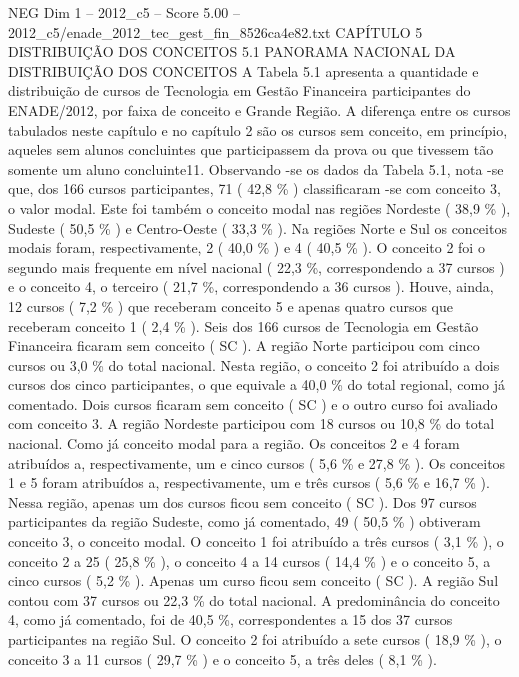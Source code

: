 \begin{textsample}{NEG Dim 1 – 2012\_c5 – Score 5.00 – 2012\_c5/enade\_2012\_tec\_gest\_fin\_8526ca4e82.txt}  \label{ex:f1_neg_326}
CAPÍTULO 5 DISTRIBUIÇÃO DOS CONCEITOS 5.1 PANORAMA NACIONAL DA DISTRIBUIÇÃO DOS CONCEITOS A Tabela 5.1 apresenta a quantidade e distribuição de cursos de Tecnologia em Gestão Financeira participantes do ENADE/2012, por faixa de conceito e Grande Região.
A diferença entre os cursos tabulados neste capítulo e no capítulo 2 são os cursos sem conceito, em princípio, aqueles sem alunos concluintes que participassem da prova ou que tivessem tão somente um aluno concluinte11.
Observando -se os dados da Tabela 5.1, nota -se que, dos 166 cursos participantes, 71 ( 42,8 \% ) classificaram -se com conceito 3, o valor modal.
Este foi também o conceito modal nas regiões Nordeste ( 38,9 \% ), Sudeste ( 50,5 \% ) e Centro-Oeste ( 33,3 \% ).
Na regiões Norte e Sul os conceitos modais foram, respectivamente, 2 ( 40,0 \% ) e 4 ( 40,5 \% ).
O conceito 2 foi o segundo mais frequente em nível nacional ( 22,3 \%, correspondendo a 37 cursos ) e o conceito 4, o terceiro ( 21,7 \%, correspondendo a 36 cursos ).
Houve, ainda, 12 cursos ( 7,2 \% ) que receberam conceito 5 e apenas quatro cursos que receberam conceito 1 ( 2,4 \% ).
Seis dos 166 cursos de Tecnologia em Gestão Financeira ficaram sem conceito ( SC ).
A região Norte participou com cinco cursos ou 3,0 \% do total nacional.
Nesta região, o conceito 2 foi atribuído a dois cursos dos cinco participantes, o que equivale a 40,0 \% do total regional, como já comentado.
Dois cursos ficaram sem conceito ( SC ) e o outro curso foi avaliado com conceito 3.
A região Nordeste participou com 18 cursos ou 10,8 \% do total nacional.
Como já conceito modal para a região.
Os conceitos 2 e 4 foram atribuídos a, respectivamente, um e cinco cursos ( 5,6 \% e 27,8 \% ).
Os conceitos 1 e 5 foram atribuídos a, respectivamente, um e três cursos ( 5,6 \% e 16,7 \% ).
Nessa região, apenas um dos cursos ficou sem conceito ( SC ).
Dos 97 cursos participantes da região Sudeste, como já comentado, 49 ( 50,5 \% ) obtiveram conceito 3, o conceito modal.
O conceito 1 foi atribuído a três cursos ( 3,1 \% ), o conceito 2 a 25 ( 25,8 \% ), o conceito 4 a 14 cursos ( 14,4 \% ) e o conceito 5, a cinco cursos ( 5,2 \% ).
Apenas um curso ficou sem conceito ( SC ).
A região Sul contou com 37 cursos ou 22,3 \% do total nacional.
A predominância do conceito 4, como já comentado, foi de 40,5 \%, correspondentes a 15 dos 37 cursos participantes na região Sul.
O conceito 2 foi atribuído a sete cursos ( 18,9 \% ), o conceito 3 a 11 cursos ( 29,7 \% ) e o conceito 5, a três deles ( 8,1 \% ).

\end{textsample}

